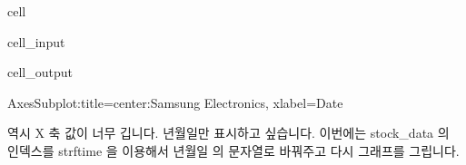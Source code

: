 \documentclass[letterpaper,10pt,english]{jupyterBook}
\begin{document}
\begin{sphinxuseclass}{cell}\begin{sphinxVerbatimInput}

\begin{sphinxuseclass}{cell_input}
\begin{sphinxVerbatim}[commandchars=\\\{\}]
\PYG{p}{[}\PYG{p}{]}\PYG{p}{[}\PYG{p}{]}    
\end{sphinxVerbatim}

\end{sphinxuseclass}\end{sphinxVerbatimInput}
\begin{sphinxVerbatimOutput}

\begin{sphinxuseclass}{cell_output}
\begin{sphinxVerbatim}[commandchars=\\\{\}]
\PYGZlt{}AxesSubplot:title=\PYGZob{}\PYGZsq{}center\PYGZsq{}:\PYGZsq{}Samsung Electronics\PYGZsq{}\PYGZcb{}, xlabel=\PYGZsq{}Date\PYGZsq{}\PYGZgt{}
\end{sphinxVerbatim}

\noindent{}

\end{sphinxuseclass}\end{sphinxVerbatimOutput}

\end{sphinxuseclass}
\sphinxAtStartPar
역시 X 축 값이 너무 깁니다. 년\sphinxhyphen{}월\sphinxhyphen{}일만 표시하고 싶습니다. 이번에는 stock\_data 의 인덱스를 strftime 을 이용해서 년\sphinxhyphen{}월\sphinxhyphen{}일 의 문자열로 바꿔주고 다시 그래프를 그립니다.
\end{document}
